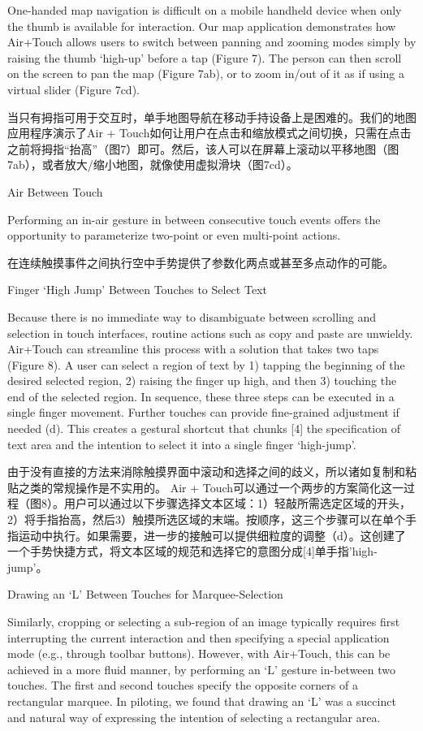 One-handed map navigation is difficult on a mobile handheld device when only the thumb is available for interaction. Our map application demonstrates how Air+Touch allows users to switch between panning and zooming modes simply by raising the thumb ‘high-up’ before a tap (Figure 7). The person can then scroll on the screen to pan the map (Figure 7ab), or to zoom in/out of it as if using a
virtual slider (Figure 7cd). 

当只有拇指可用于交互时，单手地图导航在移动手持设备上是困难的。我们的地图应用程序演示了Air + Touch如何让用户在点击和缩放模式之间切换，只需在点击之前将拇指“抬高”（图7）即可。然后，该人可以在屏幕上滚动以平移地图（图7ab），或者放大/缩小地图，就像使用虚拟滑块（图7cd）。

Air Between Touch

Performing an in-air gesture in between consecutive touch events offers the opportunity to parameterize two-point or even multi-point actions.

在连续触摸事件之间执行空中手势提供了参数化两点或甚至多点动作的可能。

Finger ‘High Jump’ Between Touches to Select Text

Because there is no immediate way to disambiguate between scrolling and selection in touch interfaces, routine actions such as copy and paste are unwieldy. Air+Touch can streamline this process with a solution that takes two taps (Figure 8). A user can select a region of text by 1) tapping the beginning of the desired selected region, 2) raising the finger up high, and then 3) touching the end of the selected region. In sequence, these three steps can be executed in a single finger movement. Further touches can provide fine-grained adjustment if needed (d). This creates a gestural shortcut that chunks [4] the specification of text area and the intention to select it into a single finger ‘high-jump’.


由于没有直接的方法来消除触摸界面中滚动和选择之间的歧义，所以诸如复制和粘贴之类的常规操作是不实用的。 Air + Touch可以通过一个两步的方案简化这一过程（图8）。用户可以通过以下步骤选择文本区域：1）轻敲所需选定区域的开头，2）将手指抬高，然后3）触摸所选区域的末端。按顺序，这三个步骤可以在单个手指运动中执行。如果需要，进一步的接触可以提供细粒度的调整（d）。这创建了一个手势快捷方式，将文本区域的规范和选择它的意图分成[4]单手指'high-jump'。

Drawing an ‘L’ Between Touches for Marquee-Selection

Similarly, cropping or selecting a sub-region of an image typically requires first interrupting the current interaction and then specifying a special application mode (e.g., through toolbar buttons). However, with Air+Touch, this can be achieved in a more fluid manner, by performing an ‘L’ gesture in-between two touches. The first and second touches specify the opposite corners of a rectangular marquee. In piloting, we found that drawing an ‘L’ was a succinct and natural way of expressing the intention of selecting a rectangular area. 

